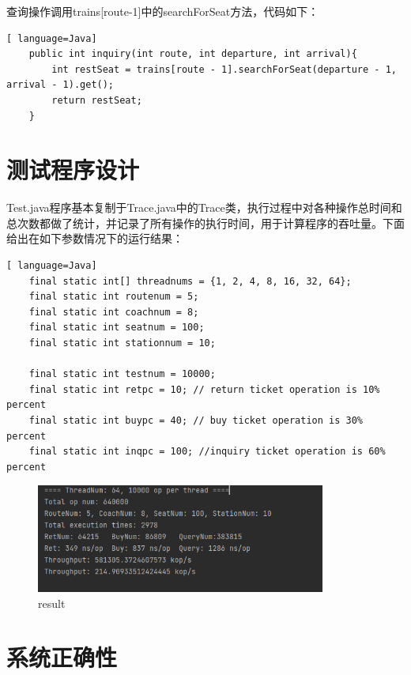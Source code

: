 \documentclass{article}
\begin{document}
查询操作调用trains[route-1]中的searchForSeat方法，代码如下：\par 
\begin{lstlisting}[ language=Java]
    public int inquiry(int route, int departure, int arrival){
        int restSeat = trains[route - 1].searchForSeat(departure - 1, arrival - 1).get();
        return restSeat;
    }
\end{lstlisting}\par

\newpage
\section{测试程序设计}
Test.java程序基本复制于Trace.java中的Trace类，执行过程中对各种操作总时间和总次数都做了统计，并记录了所有操作的执行时间，用于计算程序的吞吐量。下面给出在如下参数情况下的运行结果：\par 
\begin{lstlisting}[ language=Java]
    final static int[] threadnums = {1, 2, 4, 8, 16, 32, 64};
	final static int routenum = 5;
	final static int coachnum = 8;
	final static int seatnum = 100;
	final static int stationnum = 10;

	final static int testnum = 10000;
	final static int retpc = 10; // return ticket operation is 10% percent
	final static int buypc = 40; // buy ticket operation is 30% percent
	final static int inqpc = 100; //inquiry ticket operation is 60% percent
\end{lstlisting}\par
\begin{figure}[H]
    \centering
    \includegraphics[width = 0.85\textwidth]{1.png}
    \caption{result}
\end{figure}

\newpage
\section{系统正确性}
\end{document}
